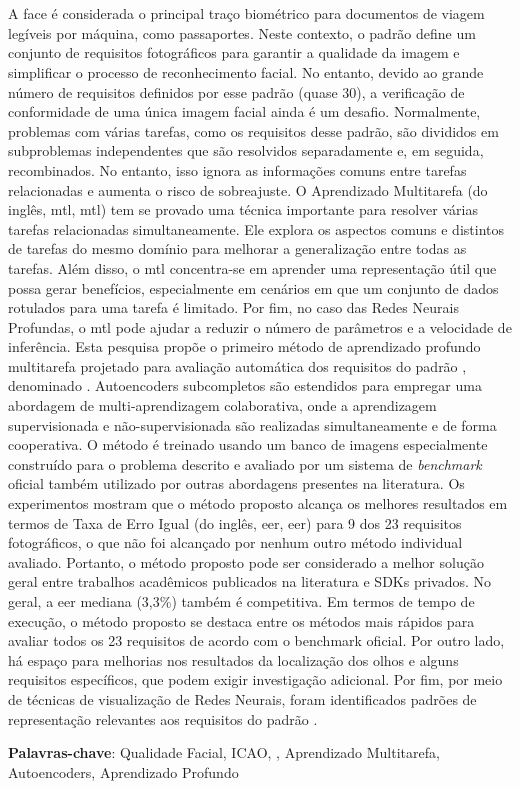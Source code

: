 \section*{}

\noindent
A face é considerada o principal traço biométrico para documentos de viagem legíveis por máquina, como passaportes. Neste contexto, o padrão \icao define um conjunto de requisitos fotográficos para garantir a qualidade da imagem e simplificar o processo de reconhecimento facial. No entanto, devido ao grande número de requisitos definidos por esse padrão (quase 30), a verificação de conformidade de uma única imagem facial ainda é um desafio. Normalmente, problemas com várias tarefas, como os requisitos desse padrão, são divididos em subproblemas independentes que são resolvidos separadamente e, em seguida, recombinados. No entanto, isso ignora as informações comuns entre tarefas relacionadas e aumenta o risco de sobreajuste. O Aprendizado Multitarefa (do inglês, \acl{mtl}, \acs{mtl}) tem se provado uma técnica importante para resolver várias tarefas relacionadas simultaneamente. Ele explora os aspectos comuns e distintos de tarefas do mesmo domínio para melhorar a generalização entre todas as tarefas. Além disso, o \acs{mtl} concentra-se em aprender uma representação útil que possa gerar benefícios, especialmente em cenários em que um conjunto de dados rotulados para uma tarefa é limitado. Por fim, no caso das Redes Neurais Profundas, o \acs{mtl} pode ajudar a reduzir o número de parâmetros e a velocidade de inferência. Esta pesquisa propõe o primeiro método de aprendizado profundo multitarefa projetado para avaliação automática dos requisitos do padrão \icao, denominado \methodname. Autoencoders subcompletos são estendidos para empregar uma abordagem de multi-aprendizagem colaborativa, onde a aprendizagem supervisionada e não-supervisionada são realizadas simultaneamente e de forma cooperativa. O método é treinado usando um banco de imagens especialmente construído para o problema descrito e avaliado por um sistema de \textit{benchmark} oficial também utilizado por outras abordagens presentes na literatura. Os experimentos mostram que o método proposto alcança os melhores resultados em termos de Taxa de Erro Igual (do inglês, \acl{eer}, \acs{eer}) para 9 dos 23 requisitos fotográficos, o que não foi alcançado por nenhum outro método individual avaliado. Portanto, o método proposto pode ser considerado a melhor solução geral entre trabalhos acadêmicos publicados na literatura e SDKs privados. No geral, a \acs{eer} mediana (3,3\%) também é competitiva. Em termos de tempo de execução, o método proposto se destaca entre os métodos mais rápidos para avaliar todos os 23 requisitos de acordo com o benchmark oficial. Por outro lado, há espaço para melhorias nos resultados da localização dos olhos e alguns requisitos específicos, que podem exigir investigação adicional. Por fim, por meio de técnicas de visualização de Redes Neurais, foram identificados padrões de representação relevantes aos requisitos do padrão \icao.

\vspace{1em}

\noindent
\textbf{Palavras-chave}: Qualidade Facial, ICAO, \icao, Aprendizado Multitarefa, Autoencoders, Aprendizado Profundo

\newpage
